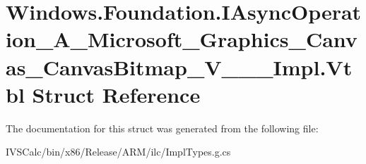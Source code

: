 \hypertarget{struct_windows_1_1_foundation_1_1_i_async_operation___a___microsoft___graphics___canvas___canvas_bitmap___v_______impl_1_1_vtbl}{}\section{Windows.\+Foundation.\+I\+Async\+Operation\+\_\+\+A\+\_\+\+Microsoft\+\_\+\+Graphics\+\_\+\+Canvas\+\_\+\+Canvas\+Bitmap\+\_\+\+V\+\_\+\+\_\+\+\_\+\+Impl.\+Vtbl Struct Reference}
\label{struct_windows_1_1_foundation_1_1_i_async_operation___a___microsoft___graphics___canvas___canvas_bitmap___v_______impl_1_1_vtbl}


The documentation for this struct was generated from the following file\+:\begin{DoxyCompactItemize}
\item 
I\+V\+S\+Calc/bin/x86/\+Release/\+A\+R\+M/ilc/Impl\+Types.\+g.\+cs\end{DoxyCompactItemize}
